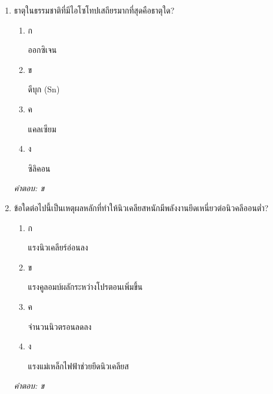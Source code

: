\documentclass[12pt]{article}
\begin{document}
\begin{enumerate}[label=\arabic*., itemsep=0.5\baselineskip, topsep=0.5\baselineskip, leftmargin=*]
\item ธาตุในธรรมชาติที่มีไอโซโทปเสถียรมากที่สุดคือธาตุใด?
\begin{enumerate}[label=\alph*)., itemsep=0.3\baselineskip, topsep=0.3\baselineskip]
\item ก\ 
\begin{minipage}[t]{0.9\linewidth}
\raggedright ออกซิเจน
\end{minipage}
\item ข\ 
\begin{minipage}[t]{0.9\linewidth}
\raggedright ดีบุก (Sn)
\end{minipage}
\item ค\ 
\begin{minipage}[t]{0.9\linewidth}
\raggedright แคลเซียม
\end{minipage}
\item ง\ 
\begin{minipage}[t]{0.9\linewidth}
\raggedright ซิลิคอน
\end{minipage}
\end{enumerate}
\vspace{-0.3\baselineskip}
\begin{small}
\textit{คำตอบ: ข}
\end{small}

\item ข้อใดต่อไปนี้เป็นเหตุผลหลักที่ทำให้นิวเคลียสหนักมีพลังงานยึดเหนี่ยวต่อนิวคลีออนต่ำ?
\begin{enumerate}[label=\alph*)., itemsep=0.3\baselineskip, topsep=0.3\baselineskip]
\item ก\ 
\begin{minipage}[t]{0.9\linewidth}
\raggedright แรงนิวเคลียร์อ่อนลง
\end{minipage}
\item ข\ 
\begin{minipage}[t]{0.9\linewidth}
\raggedright แรงคูลอมบ์ผลักระหว่างโปรตอนเพิ่มขึ้น
\end{minipage}
\item ค\ 
\begin{minipage}[t]{0.9\linewidth}
\raggedright จำนวนนิวตรอนลดลง
\end{minipage}
\item ง\ 
\begin{minipage}[t]{0.9\linewidth}
\raggedright แรงแม่เหล็กไฟฟ้าช่วยยึดนิวเคลียส
\end{minipage}
\end{enumerate}
\vspace{-0.3\baselineskip}
\begin{small}
\textit{คำตอบ: ข}
\end{small}


\end{enumerate}
\end{document}
